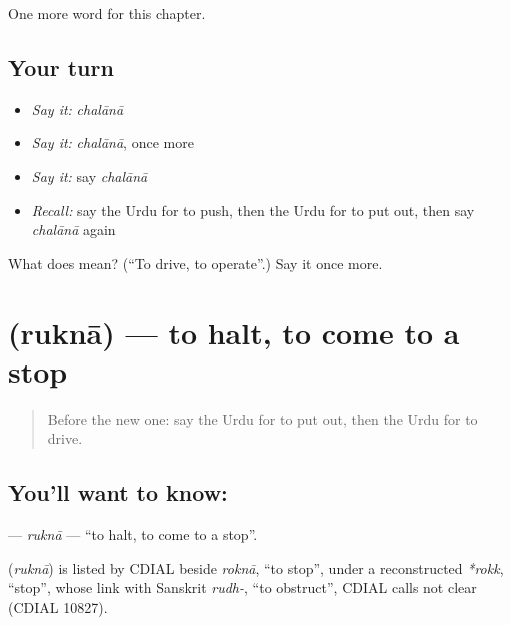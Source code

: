 \begin{grammarlens}[title={What you've built}]
One more word for this chapter.
\end{grammarlens}

\subsection*{Your turn}
\begin{itemize}
\raggedright
  \item \emph{Say it:} \emph{chalānā}
  \item \emph{Say it:} \emph{chalānā}, once more
  \item \emph{Say it:} say \emph{chalānā}
  \item \emph{Recall:} say the Urdu for to push, then the Urdu for to put out, then say \emph{chalānā} again
\end{itemize}

\begin{tcolorbox}[breakable,colback=teal!4,colframe=teal!35!black,title={Before you move on}]
What does  mean? (\textquotedblleft{}To drive, to operate\textquotedblright{}.) Say it once more.
\end{tcolorbox}
\section[\texorpdfstring{\ur{رکنا} (ruknā)}{رکنا (ruknā)}]{ (ruknā) — to halt, to come to a stop}

\label{lesson:UR-C240-rukna}



\begin{quote}
Before the new one: say the Urdu for to put out, then the Urdu for to drive.
\end{quote}

\subsection*{You'll want to know: }
\textbf{} — \emph{ruknā} — \textquotedblleft{}to halt, to come to a stop\textquotedblright{}.

\begin{cousinweb}
\textbf{} (\emph{ruknā}) is listed by CDIAL beside \emph{roknā}, \textquotedblleft{}to stop\textquotedblright{}, under a reconstructed \emph{*rokk}, \textquotedblleft{}stop\textquotedblright{}, whose link with Sanskrit \emph{rudh-}, \textquotedblleft{}to obstruct\textquotedblright{}, CDIAL calls not clear (CDIAL 10827).
\end{cousinweb}

